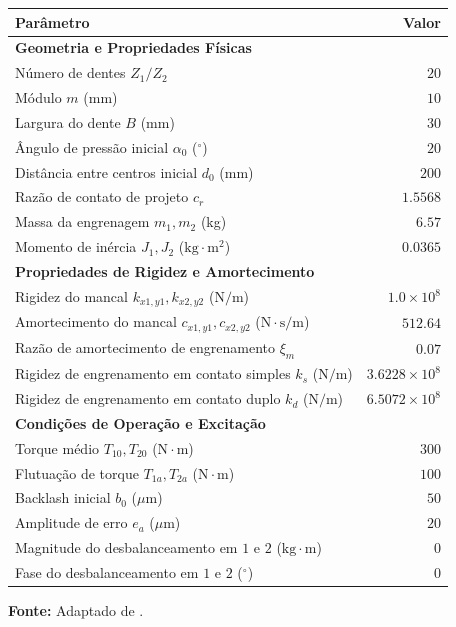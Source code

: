 \begin{table}[H]
\begin{threeparttable}
	\begin{tabularx}{0.8\textwidth}{X r}
		\hline
		\textbf{Parâmetro} & \textbf{Valor} \\
		\hline
		\multicolumn{2}{l}{\textbf{Geometria e Propriedades Físicas}} \\
		\hline
		Número de dentes $Z_1/Z_2$ & $20$ \\
		Módulo $m$ (mm) & $10$ \\
		Largura do dente $B$ (mm) & $30$ \\
		Ângulo de pressão inicial $\alpha_0$ ($^\circ$) & $20$ \\
		Distância entre centros inicial $d_0$ (mm) & $200$ \\
		Razão de contato de projeto $c_r$ & $1.5568$ \\
		Massa da engrenagem $m_1, m_2$ (kg) & $6.57$ \\
		Momento de inércia $J_1, J_2$ ($\mathrm{kg\cdot m^2}$) & $0.0365$ \\
		\hline
		\multicolumn{2}{l}{\textbf{Propriedades de Rigidez e Amortecimento}} \\
		\hline
		Rigidez do mancal $k_{x1, y1}, k_{x2, y2}$ ($\mathrm{N/m}$) & $1.0 \times 10^8$ \\
		Amortecimento do mancal $c_{x1, y1}, c_{x2, y2}$ ($\mathrm{N\cdot s/m}$) & $512.64$ \\
		Razão de amortecimento de engrenamento $\xi_m$ & $0.07$ \\
		Rigidez de engrenamento em contato simples $k_s$ ($\mathrm{N/m}$) & $3.6228 \times 10^8$ \\
		Rigidez de engrenamento em contato duplo $k_d$ ($\mathrm{N/m}$) & $6.5072 \times 10^8$ \\
		\hline
		\multicolumn{2}{l}{\textbf{Condições de Operação e Excitação}} \\
		\hline
		Torque médio $T_{10}, T_{20}$ ($\mathrm{N\cdot m}$) & $300$ \\
		Flutuação de torque $T_{1a}, T_{2a}$ ($\mathrm{N\cdot m}$) & $100$ \\
		Backlash inicial $b_0$ ($\mu$m) & $50$ \\
		Amplitude de erro $e_a$ ($\mu$m) & $20$ \\
		Magnitude do desbalanceamento em $1$ e $2$ ($\mathrm{kg\cdot m}$) & $0$ \\
		Fase do desbalanceamento em $1$ e $2$ ($^\circ$) & $0$ \\
		\hline
	\end{tabularx}
	
	\begin{tablenotes}[flushleft]
		\scriptsize
		\item \textbf{Fonte:} Adaptado de .
	\end{tablenotes}
	
\end{threeparttable}
\end{table}


